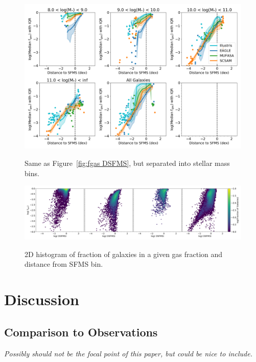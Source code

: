 \documentclass[fleqn,usenatbib]{mnras}
\begin{document}
\begin{figure}
\includegraphics[width = 0.99\linewidth]{fgas_DSFMS_panel_plot_IQR_logged.png}\\
\caption{Same as Figure~\ref{fig:fgas DSFMS}, but separated into stellar mass bins.}
\label{fig:fgas DSFMS panel}
\end{figure}

\begin{figure}
\includegraphics[width = 0.99\linewidth]{fgas_DSFMS_2dhist_count_log_fgas.png}\\
\caption{2D histogram of fraction of galaxies in a given gas fraction and distance from SFMS bin.}
\label{fig:fgas DSFMS panel}
\end{figure}

\section{Discussion}

\subsection{Comparison to Observations}
\label{sec:observations}
{\it Possibly should not be the focal point of this paper, but could be nice to include. } 
\end{document}
